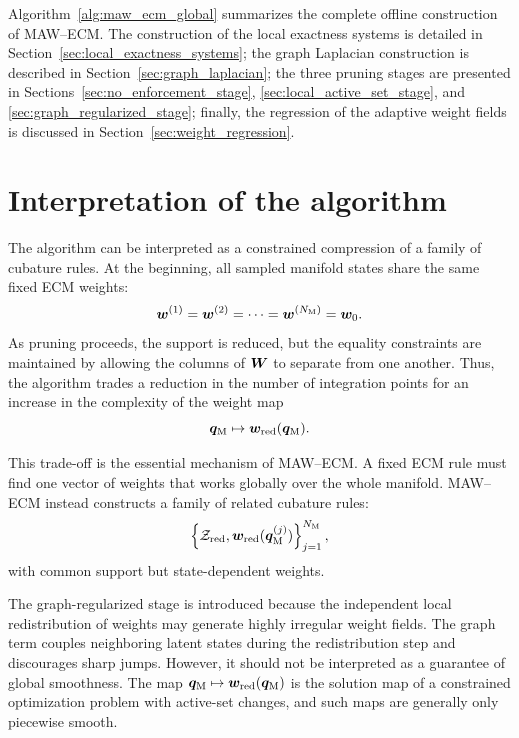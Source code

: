 \documentclass[11pt,a4paper]{article}
\begin{document}
Algorithm~\ref{alg:maw_ecm_global} summarizes the complete offline
construction of MAW--ECM. The construction of the local exactness systems is
detailed in Section~\ref{sec:local_exactness_systems}; the graph Laplacian
construction is described in Section~\ref{sec:graph_laplacian}; the three
pruning stages are presented in
Sections~\ref{sec:no_enforcement_stage},
\ref{sec:local_active_set_stage}, and
\ref{sec:graph_regularized_stage}; finally, the regression of the adaptive
weight fields is discussed in
Section~\ref{sec:weight_regression}.

\section{Interpretation of the algorithm}

The algorithm can be interpreted as a constrained compression of a family of
cubature rules. At the beginning, all sampled manifold states share the same
fixed ECM weights:
\[
        \bm w^{(1)}
        =
        \bm w^{(2)}
        =
        \cdots
        =
        \bm w^{(N_{\mathrm{M}})}
        =
        \bm w_{0}.
\]
As pruning proceeds, the support is reduced, but the equality constraints are
maintained by allowing the columns of $\bm W$ to separate from one another.
Thus, the algorithm trades a reduction in the number of integration points for
an increase in the complexity of the weight map
\[
        \bm q_{\mathrm{M}}\mapsto\bm w_{\mathrm{red}}(\bm q_{\mathrm{M}}).
\]

This trade-off is the essential mechanism of MAW--ECM. A fixed ECM rule must
find one vector of weights that works globally over the whole manifold. MAW--ECM
instead constructs a family of related cubature rules:
\[
        \left\{
        \mathcal{Z}_{\mathrm{red}},\bm w_{\mathrm{red}}(\bm q_{\mathrm{M}}^{(j)})
        \right\}_{j=1}^{N_{\mathrm{M}}},
\]
with common support but state-dependent weights.

The graph-regularized stage is introduced because the independent local
redistribution of weights may generate highly irregular weight fields. The graph
term couples neighboring latent states during the redistribution step and
discourages sharp jumps. However, it should not be interpreted as a guarantee of
global smoothness. The map $\bm q_{\mathrm{M}}\mapsto\bm w_{\mathrm{red}}(\bm q_{\mathrm{M}})$ is the solution map of a
constrained optimization problem with active-set changes, and such maps are
generally only piecewise smooth.

\end{document}
